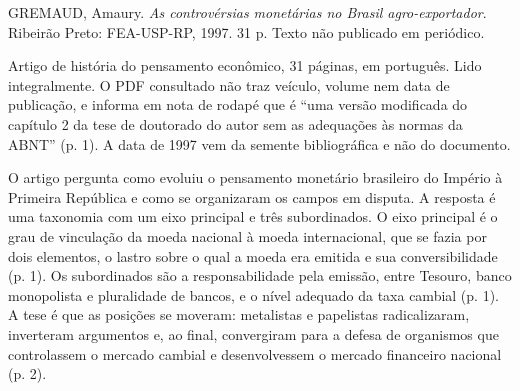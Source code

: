 
\begin{identificacao}
GREMAUD, Amaury. \emph{As controvérsias monetárias no Brasil
agro-exportador}. Ribeirão Preto: FEA-USP-RP, 1997. 31 p. Texto não
publicado em periódico.

Artigo de história do pensamento econômico, 31 páginas, em português. Lido
integralmente. O PDF consultado não traz veículo, volume nem data de
publicação, e informa em nota de rodapé que é ``uma versão modificada do
capítulo 2 da tese de doutorado do autor sem as adequações às normas da
ABNT'' (p. 1). A data de 1997 vem da semente bibliográfica e não do documento.
\end{identificacao}

O artigo pergunta como evoluiu o pensamento monetário brasileiro do Império à
Primeira República e como se organizaram os campos em disputa. A resposta é
uma taxonomia com um eixo principal e três subordinados. O eixo principal é o
grau de vinculação da moeda nacional à moeda internacional, que se fazia por
dois elementos, o lastro sobre o qual a moeda era emitida e sua
conversibilidade (p. 1). Os subordinados são a responsabilidade pela emissão,
entre Tesouro, banco monopolista e pluralidade de bancos, e o nível adequado da
taxa cambial (p. 1). A tese é que as posições se moveram: metalistas e
papelistas radicalizaram, inverteram argumentos e, ao final, convergiram para a
defesa de organismos que controlassem o mercado cambial e desenvolvessem o
mercado financeiro nacional (p. 2).


